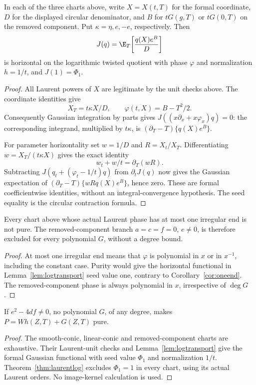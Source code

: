 \begin{lemma}\label{lem:logtransport}
In each of the three charts above, write $X=X(t,T)$ for the formal
coordinate, $D$ for the displayed circular denominator, and $B$ for
$tG(g,T)$ or $tG(0,T)$ on the removed component. Put
$\kappa=\eta,e,-e$, respectively. Then
\[
 J(q)=\E_T\!\left[\frac{q(X)e^B}{D}\right]
\]
is horizontal on the logarithmic twisted quotient with phase
$\varphi$ and normalization $h=1/t$, and $J(1)=\Phi_1$.
\end{lemma}
\begin{proof}
All Laurent powers of $X$ are legitimate by the unit checks above.
The coordinate identities give
\[
 X_T=t\kappa X/D,\qquad
 \varphi(t,X)=B-T^2/2.
\]
Consequently Gaussian integration by parts gives
$J((x\partial_x+x\varphi_x)q)=0$: the corresponding integrand,
multiplied by $t\kappa$, is
$(\partial_T-T)\{q(X)e^B\}$.

For parameter horizontality set $w=1/D$ and $R=X_t/X_T$.
Differentiating $w=X_T/(t\kappa X)$ gives the exact identity
\[
 w_t+w/t=\partial_T(wR).
\]
Subtracting $J(q_t+(\varphi_t-1/t)q)$ from $\partial_tJ(q)$ now
gives the Gaussian expectation of
$(\partial_T-T)\{wR q(X)e^B\}$, hence zero. These are formal
coefficientwise identities, without an integral-convergence hypothesis.
The seed equality is the circular contraction formula.
\end{proof}

\begin{proposition}\label{prop:oneendgaussian}
Every chart above whose actual Laurent phase has at most one
irregular end is not pure. The removed-component branch
$a=c=f=0$, $e\ne0$, is therefore excluded for every polynomial $G$,
without a degree bound.
\end{proposition}
\begin{proof}
At most one irregular end means that $\varphi$ is polynomial in
$x$ or in $x^{-1}$, including the constant case. Purity would give
the horizontal functional in Lemma~\ref{lem:logtransport} seed value
one, contrary to Corollary~\ref{cor:oneend}. The removed-component
phase is always polynomial in $x$, irrespective of $\deg G$.
\end{proof}



\begin{proposition}\label{prop:nondeglog}
If $e^2-4df\ne0$, no polynomial $G$, of any degree, makes
$P=Wh(Z,T)+G(Z,T)$ pure.
\end{proposition}
\begin{proof}
The smooth-conic, linear-conic and removed-component charts are
exhaustive. Their Laurent-unit checks and
Lemma~\ref{lem:logtransport} give the formal Gaussian functional
with seed value $\Phi_1$ and normalization $1/t$.
Theorem~\ref{thm:laurentlog} excludes $\Phi_1=1$ in every chart,
using its actual Laurent orders. No image-kernel calculation is used.
\end{proof}

